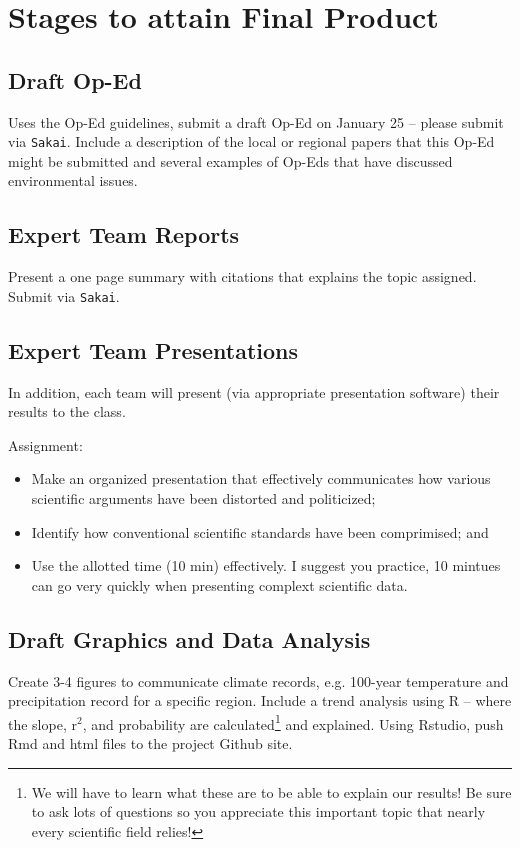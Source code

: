 \documentclass{article}\usepackage[]{graphicx}\usepackage[]{color}
\begin{document}
\section{Stages to attain Final Product}

\subsection{Draft Op-Ed}

Uses the Op-Ed guidelines, submit a draft Op-Ed on January 25 -- please submit via \texttt{Sakai}. Include a description of the local or regional papers that this Op-Ed might be submitted and several examples of Op-Eds that have discussed environmental issues.

\subsection{Expert Team Reports}

Present a one page summary with citations that explains the topic assigned. Submit via \texttt{Sakai}. 

\subsection{Expert Team Presentations}

In addition, each team will present (via appropriate presentation software) their results to the class. 

\noindent Assignment: 
\begin{itemize}
  \item Make an organized presentation that effectively communicates how various scientific arguments have been distorted and politicized;
  \item Identify how conventional scientific standards have been comprimised; and
  \item Use the allotted time (10 min) effectively. I suggest you practice, 10 mintues can go very quickly when presenting complext scientific data.
  
\end{itemize}

\subsection{Draft Graphics and Data Analysis}

Create 3-4 figures to communicate climate records, e.g. 100-year temperature and precipitation record for a specific region. Include a trend analysis using R -- where the slope, r$^2$, and probability are calculated\footnote{We will have to learn what these are to be able to explain our results! Be sure to ask lots of questions so you appreciate this important topic that nearly every scientific field relies!} and explained. Using Rstudio, push Rmd and html files to the project Github site. 
\end{document}
